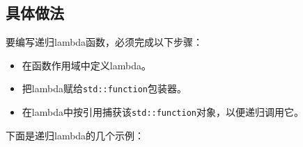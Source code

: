 
\subsection{具体做法}



要编写递归lambda函数，必须完成以下步骤：



\begin{itemize}
\item 在函数作用域中定义lambda。



\item 把lambda赋给\texttt{std::\allowbreak{}function}包装器。



\item 在lambda中按引用捕获该\texttt{std::\allowbreak{}function}对象，以便递归调用它。

\end{itemize}



下面是递归lambda的几个示例：



